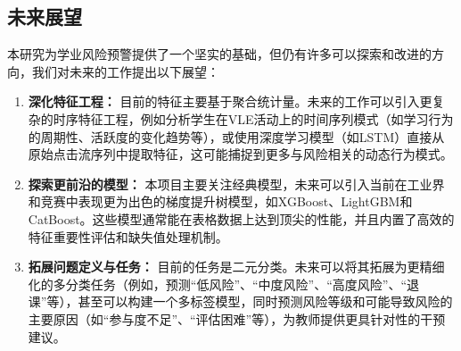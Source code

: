 \documentclass{SYSUReport}
\begin{document}
\subsection{未来展望}
本研究为学业风险预警提供了一个坚实的基础，但仍有许多可以探索和改进的方向，我们对未来的工作提出以下展望：

\begin{enumerate}
    \item \textbf{深化特征工程：} 目前的特征主要基于聚合统计量。未来的工作可以引入更复杂的时序特征工程，例如分析学生在VLE活动上的时间序列模式（如学习行为的周期性、活跃度的变化趋势等），或使用深度学习模型（如LSTM）直接从原始点击流序列中提取特征，这可能捕捉到更多与风险相关的动态行为模式。

    \item \textbf{探索更前沿的模型：} 本项目主要关注经典模型，未来可以引入当前在工业界和竞赛中表现更为出色的梯度提升树模型，如XGBoost、LightGBM和CatBoost。这些模型通常能在表格数据上达到顶尖的性能，并且内置了高效的特征重要性评估和缺失值处理机制。

    \item \textbf{拓展问题定义与任务：} 目前的任务是二元分类。未来可以将其拓展为更精细化的多分类任务（例如，预测“低风险”、“中度风险”、“高度风险”、“退课”等），甚至可以构建一个多标签模型，同时预测风险等级和可能导致风险的主要原因（如“参与度不足”、“评估困难”等），为教师提供更具针对性的干预建议。
\end{enumerate}



\newpage


\end{document}

